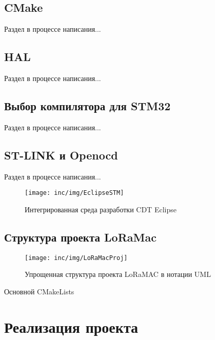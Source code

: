 \subsection{CMake}

Раздел в процессе написания...

\subsection{HAL}

Раздел в процессе написания...

\subsection{Выбор компилятора для STM32}

Раздел в процессе написания...

\subsection{ST-LINK и Openocd}

Раздел в процессе написания...

\begin{figure}[!h]
  \centering
  \texttt{[image: inc/img/EclipseSTM]}
  \caption{Интегрированная среда разработки CDT Eclipse}
  \label{fig:ideeclipse}
\end{figure}


\begin{listing}[H]
 
\end{listing}
\label{lst:boardinit}

\subsection{Структура проекта LoRaMac}
\begin{figure}[!h]
  \centering
  \texttt{[image: inc/img/LoRaMacProj]}
  \caption{Упрощенная структура проекта LoRaMAC в нотации UML}
  \label{fig:loramacstructure}
\end{figure}

\begin{listing}[H]
\caption{Основной CMakeLists} 
\end{listing}
\label{lst:maincmake}

\section{Реализация проекта}

